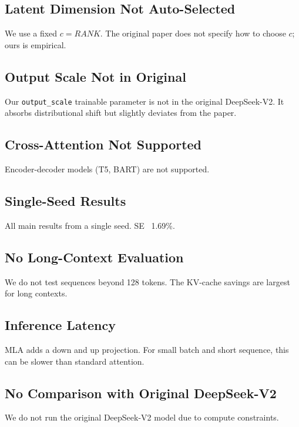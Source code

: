 \subsection{Latent Dimension Not Auto-Selected}

We use a fixed $c = {{RANK}}$. The original paper does not specify how to 
choose $c$; ours is empirical.

\subsection{Output Scale Not in Original}

Our \texttt{output\_scale} trainable parameter is not in the original DeepSeek-V2. 
It absorbs distributional shift but slightly deviates from the paper.

\subsection{Cross-Attention Not Supported}

Encoder-decoder models (T5, BART) are not supported.

\subsection{Single-Seed Results}

All main results from a single seed. SE ~1.69\%.

\subsection{No Long-Context Evaluation}

We do not test sequences beyond 128 tokens. The KV-cache savings are 
largest for long contexts.

\subsection{Inference Latency}

MLA adds a down and up projection. For small batch and short sequence, this 
can be slower than standard attention.

\subsection{No Comparison with Original DeepSeek-V2}

We do not run the original DeepSeek-V2 model due to compute constraints.

